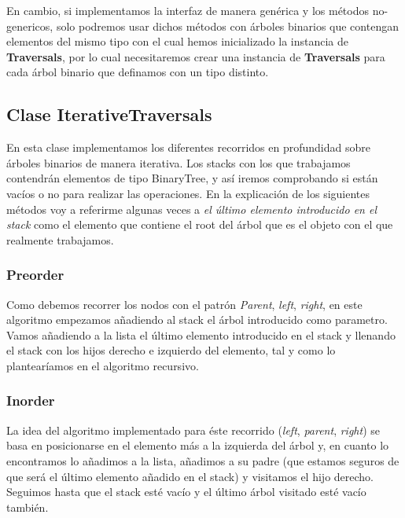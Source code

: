 \documentclass{article}
\begin{document}
            En cambio, si implementamos la interfaz de manera genérica y los métodos no-genericos, solo podremos usar dichos métodos con árboles binarios que contengan elementos del mismo tipo con el cual hemos inicializado la instancia de \textbf{Traversals}, \newline por lo cual necesitaremos crear una instancia de \textbf{Traversals} para cada árbol binario que definamos con un tipo distinto.
            
       \subsection{Clase IterativeTraversals}
            En esta clase implementamos los diferentes recorridos en profundidad sobre árboles binarios de manera iterativa. \newline
            Los stacks con los que trabajamos contendrán elementos de tipo BinaryTree, y así iremos comprobando si están vacíos o no para realizar las operaciones.\newline
            En la explicación de los siguientes métodos voy a referirme algunas
            veces a \textit{el último elemento introducido en el stack} como el elemento que contiene el root del árbol que es el objeto con el que realmente trabajamos.
            
        \subsubsection{Preorder}
        Como debemos recorrer los nodos con el patrón \textit{Parent},
        \textit{left}, \textit{right}, en este algoritmo empezamos añadiendo al stack el árbol introducido como parametro.\newline
        Vamos añadiendo a la lista el último elemento introducido en el stack y llenando el stack con los hijos derecho e izquierdo del elemento, tal y como lo plantearíamos en el algoritmo recursivo.
        
        \subsubsection{Inorder}
        La idea del algoritmo implementado para éste recorrido (\textit{left}, \textit{parent}, \textit{right}) se basa en posicionarse en el elemento más a la izquierda del árbol y, en cuanto lo encontramos lo añadimos a la lista, añadimos a su padre (que estamos seguros de que será el último elemento añadido en el stack) y visitamos el hijo derecho. \newline
        Seguimos hasta que el stack esté vacío y el último árbol visitado esté vacío también.
        
\end{document}
